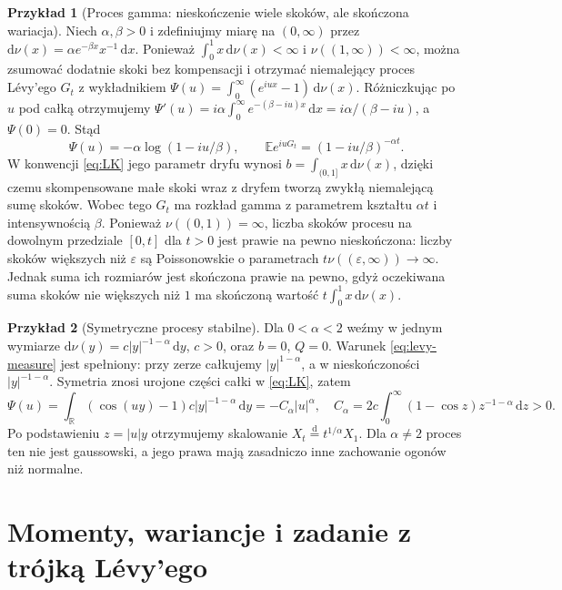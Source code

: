 \documentclass[11pt,a4paper,oneside]{report}
\numberwithin{equation}{chapter}
\theoremstyle{plain}
\theoremstyle{definition}
\newtheorem{przyklad}{Przykład}[chapter]
\theoremstyle{remark}
\newcommand{\R}{\mathbb{R}}
\newcommand{\E}{\mathbb{E}}
\newcommand{\dd}{\mathrm{d}}
\begin{document}
\begin{przyklad}[Proces gamma: nieskończenie wiele skoków, ale skończona wariacja]
Niech $\alpha,\beta>0$ i zdefiniujmy miarę na
$(0,\infty)$ przez
$\dd\nu(x)=\alpha e^{-\beta x}x^{-1}\,\dd x$.
Ponieważ $\int_0^1x\,\dd\nu(x)<\infty$ i
$\nu((1,\infty))<\infty$, można zsumować dodatnie
skoki bez kompensacji i otrzymać niemalejący proces Lévy'ego
$G_t$ z wykładnikiem
$\Psi(u)=\int_0^\infty(e^{iux}-1)\,\dd\nu(x)$.
Różniczkując po $u$ pod całką otrzymujemy
$\Psi'(u)=i\alpha\int_0^\infty e^{-(\beta-iu)x}\,\dd x
=i\alpha/(\beta-iu)$, a $\Psi(0)=0$. Stąd
\[
\Psi(u)=-\alpha\log(1-iu/\beta),\qquad
\E e^{iuG_t}=(1-iu/\beta)^{-\alpha t}.
\]
W konwencji \eqref{eq:LK} jego parametr dryfu wynosi
$b=\int_{(0,1]}x\,\dd\nu(x)$, dzięki czemu
skompensowane małe skoki wraz z dryfem tworzą zwykłą
niemalejącą sumę skoków. Wobec tego $G_t$ ma rozkład gamma z parametrem kształtu
$\alpha t$ i intensywnością $\beta$.
Ponieważ $\nu((0,1))=\infty$, liczba skoków procesu
na dowolnym przedziale $[0,t]$ dla $t>0$ jest prawie
na pewno nieskończona: liczby skoków większych niż
$\varepsilon$ są Poissonowskie o parametrach
$t\nu((\varepsilon,\infty))\to\infty$.
Jednak suma ich rozmiarów jest skończona prawie na pewno,
gdyż oczekiwana suma skoków nie większych niż $1$
ma skończoną wartość $t\int_0^1x\,\dd\nu(x)$.
\end{przyklad}

\begin{przyklad}[Symetryczne procesy stabilne]
Dla $0<\alpha<2$ weźmy w jednym wymiarze
$\dd\nu(y)=c|y|^{-1-\alpha}\,\dd y$, $c>0$,
oraz $b=0$, $Q=0$. Warunek \eqref{eq:levy-measure}
jest spełniony: przy zerze całkujemy $|y|^{1-\alpha}$,
a w nieskończoności $|y|^{-1-\alpha}$.
Symetria znosi urojone części całki w \eqref{eq:LK}, zatem
\[
\Psi(u)=\int_\R(\cos(uy)-1)c|y|^{-1-\alpha}\,\dd y
=-C_\alpha |u|^\alpha,
\quad
C_\alpha=2c\int_0^\infty(1-\cos z)z^{-1-\alpha}\,\dd z>0.
\]
Po podstawieniu $z=|u|y$ otrzymujemy skalowanie
$X_t\overset{\mathrm d}=t^{1/\alpha}X_1$.
Dla $\alpha\ne2$ proces ten nie jest gaussowski, a jego
prawa mają zasadniczo inne zachowanie ogonów niż normalne.
\end{przyklad}

\section{Momenty, wariancje i zadanie z trójką Lévy'ego}\label{sec:volIII:10:09}
\end{document}
